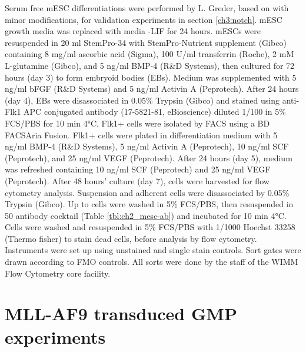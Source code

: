Serum free mESC differentiations were performed by L. Greder, based on \cite{pearson_vivo_2015} with minor modifications, for validation experiments in section \ref{ch3:notch}. mESC growth media was replaced with media -LIF for 24 hours.  mESCs were resuspended in 20 ml StemPro-34 with StemPro-Nutrient supplement (Gibco) containing 8 mg/ml ascorbic acid (Sigma), 100 U/ml transferrin (Roche), 2 mM L-glutamine (Gibco), and 5 ng/ml BMP-4 (R\&D Systems), then cultured for 72 hours (day 3) to form embryoid bodies (EBs). Medium was supplemented with 5 ng/ml bFGF (R\&D Systems) and 5 ng/ml Activin A (Peprotech). After 24 hours (day 4), EBs were disassociated in 0.05\% Trypsin (Gibco) and stained using anti-Flk1 APC conjugated antibody (17-5821-81, eBioscience) diluted 1/100 in 5\% FCS/PBS for 10 min 4°C. Flk1+ cells were isolated by FACS using a BD FACSAria Fusion.  Flk1+ cells were plated in differentiation medium with 5 ng/ml BMP-4 (R\&D Systems), 5 ng/ml Activin A (Peprotech), 10 ng/ml SCF (Peprotech), and 25 ng/ml VEGF (Peprotech). After 24 hours (day 5), medium was refreshed containing 10 ng/ml SCF (Peprotech) and 25 ng/ml VEGF (Peprotech). After 48 hours' culture (day 7), cells were harvested for flow cytometry analysis. Suspension and adherent cells were disassociated by 0.05\% Trypsin (Gibco). Up to  cells were washed in 5\% FCS/PBS, then resuspended in 50 \microl{} antibody cocktail (Table \ref{tbl:ch2_mesc-ab}) and incubated for 10 min 4°C. Cells were washed and resuspended in 5\% FCS/PBS with 1/1000 Hoechst 33258 (Thermo fisher) to stain dead cells, before analysis by flow cytometry. Instruments were set up using unstained and single stain controls. Sort gates were drawn according to FMO controls. All sorts were done by the staff of the WIMM Flow Cytometry core facility. 

\section{MLL-AF9 transduced GMP experiments}

